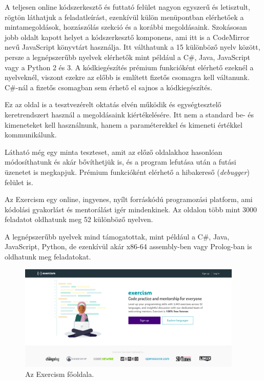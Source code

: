 A teljesen online kódszerkesztő és futtató felület nagyon egyszerű és letisztult, rögtön láthatjuk a feladatleírást, ezenkívül külön menüpontban elérhetőek a mintamegoldások, hozzászólás szekció és a korábbi megoldásaink. Szokásosan jobb oldalt kapott helyet a kódszerkesztő komponens, ami itt is a CodeMirror nevű JavaScript könyvtárt használja. Itt válthatunk a 15 különböző nyelv között, persze a legnépszerűbb nyelvek elérhetők mint például a C\#, Java, JavaScript vagy a Python 2 és 3. A kódkiegészítés prémium funkcióként elérhető ezeknél a nyelveknél, viszont ezekre az előbb is említett fizetős csomagra kell váltanunk. C\#-nál a fizetős csomagban sem érhető el sajnos a kódkiegészítés.

Ez az oldal is a tesztvezérelt oktatás elvén működik és egységtesztelő keretrendszert használ a megoldásaink kiértékelésére. Itt nem a standard be- és kimeneteket kell használnunk, hanem a paraméterekkel és kimeneti értékkel kommunikálunk.

Látható még egy minta teszteset, amit az előző oldalakhoz hasonlóan módosíthatunk és akár bővíthetjük is, és a program lefutása után a futási üzenetet is megkapjuk. Prémium funkcióként elérhető a hibakereső (\emph{debugger}) felület is.


Az Exercism egy online, ingyenes, nyílt forráskódú programozási platform, ami kódolási gyakorlást és mentorálást igér mindenkinek. Az oldalon több mint 3000 feladatot oldhatunk meg 52 különböző nyelven. \cite{exercism}

A legnépszerűbb nyelvek mind támogatottak, mint például a C\#, Java, JavaScript, Python, de ezenkívül akár x86-64 assembly-ben vagy Prolog-ban is oldhatunk meg feladatokat.

\begin{figure}[h]
    \centering
    \includegraphics[width=0.95\textwidth]{images/exercism_homepage.png}
    \caption{Az Exercism főoldala.}
    \label{fig:exercism_homepage}
\end{figure}

